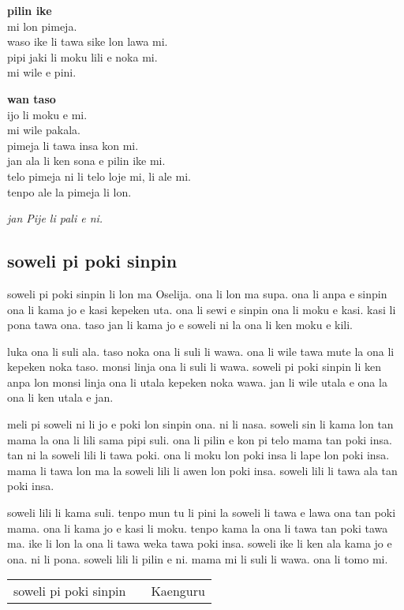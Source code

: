 \textbf{pilin ike} \\
mi lon pimeja.  \\
waso ike li tawa sike lon lawa mi.  \\
pipi jaki li moku lili e noka mi.  \\
mi wile e pini.  

\textbf{wan taso} \\
ijo li moku e mi.  \\
mi wile pakala.  \\
pimeja li tawa insa kon mi.  \\
jan ala li ken sona e pilin ike mi.  \\
telo pimeja ni li telo loje mi, li ale mi.  \\
tenpo ale la pimeja li lon. 

\textit{jan Pije li pali e ni. \cite{www:Pije:01}}
%
\subsection{soweli pi poki sinpin}

soweli pi poki sinpin li lon ma Oselija.
ona li lon ma supa.
ona li anpa e sinpin ona li kama jo e kasi kepeken uta.
ona li sewi e sinpin ona li moku e kasi.
kasi li pona tawa ona.
taso jan li kama jo e soweli ni la ona li ken moku e kili.

luka ona li suli ala.
taso noka ona li suli li wawa.
ona li wile tawa mute la ona li kepeken noka taso.
monsi linja ona li suli li wawa.
soweli pi poki sinpin li ken anpa lon monsi linja ona li utala kepeken noka wawa.
jan li wile utala e ona la ona li ken utala e jan.

meli pi soweli ni li jo e poki lon sinpin ona.
ni li nasa.
soweli sin li kama lon tan mama la ona li lili sama pipi suli.
ona li pilin e kon pi telo mama tan poki insa.
tan ni la soweli lili li tawa poki.
ona li moku lon poki insa li lape lon poki insa.
mama li tawa lon ma la soweli lili li awen lon poki insa.
soweli lili li tawa ala tan poki insa.

soweli lili li kama suli.
tenpo mun tu li pini la soweli li tawa e lawa ona tan poki mama.
ona li kama jo e kasi li moku.
tenpo kama la ona li tawa tan poki tawa ma.
ike li lon la ona li tawa weka tawa poki insa.
soweli ike li ken ala kama jo e ona.
ni li pona.
soweli lili li pilin e ni.
\glqq mama mi li suli li wawa.
ona li tomo mi.\grqq

\begin{supertabular}{p{5,5cm}|ll}
soweli pi poki sinpin && Kaenguru \\ 
\end{supertabular}

